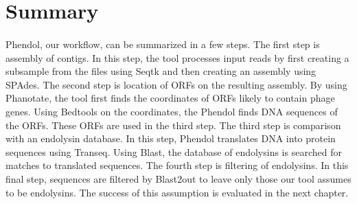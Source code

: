 \section{Summary}
\paragraph*{}
Phendol, our workflow, can be summarized in a few steps. The first step is assembly of contigs. In this step, the tool processes input reads by first creating a subsample from the files using Seqtk and then creating an assembly using SPAdes. The second step is location of ORFs on the resulting assembly. By using Phanotate, the tool first finds the coordinates of ORFs likely to contain phage genes. Using Bedtools on the coordinates, the Phendol finds DNA sequences of the ORFs. These ORFs are used in the third step. The third step is comparison with an endolysin database. In this step, Phendol translates DNA into protein sequences using Transeq. Using Blast, the database of endolysins is searched for matches to translated sequences. The fourth step is filtering of endolysins. In this final step, sequences are filtered by Blast2out to leave only those our tool assumes to be endolysins. The success of this assumption is evaluated in the next chapter.